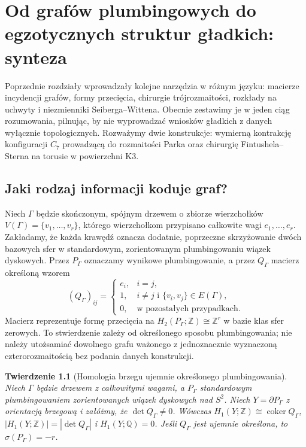\documentclass[11pt,a4paper]{report}
\numberwithin{equation}{section}
\theoremstyle{plain}
\newtheorem{twierdzenie}{Twierdzenie}[section]
\theoremstyle{definition}
\theoremstyle{remark}
\begin{document}
\chapter{Od grafów plumbingowych do egzotycznych struktur gładkich: synteza}
\label{ch:tg-synteza16}

Poprzednie rozdziały wprowadzały kolejne narzędzia w różnym języku:
macierze incydencji grafów, formy przecięcia, chirurgie trójrozmaitości,
rozkłady na uchwyty i niezmienniki Seiberga--Wittena. Obecnie zestawimy
je w jeden ciąg rozumowania, pilnując, by nie wyprowadzać wniosków
gładkich z danych wyłącznie topologicznych. Rozważymy dwie konstrukcje:
wymierną kontrakcję konfiguracji $C_7$ prowadzącą do rozmaitości Parka
oraz chirurgię Fintushela--Sterna na torusie w powierzchni K3.

\section{Jaki rodzaj informacji koduje graf?}
\label{sec:tg-syn-graph}

Niech $\Gamma$ będzie skończonym, spójnym drzewem o zbiorze
wierzchołków $V(\Gamma)=\{v_1,\ldots,v_r\}$, którego wierzchołkom
przypisano całkowite wagi $e_1,\ldots,e_r$. Zakładamy, że każda
krawędź oznacza dodatnie, poprzeczne skrzyżowanie dwóch bazowych sfer
w standardowym, zorientowanym plumbingowaniu wiązek dyskowych.
Przez $P_\Gamma$ oznaczamy wynikowe plumbingowanie, a przez
$Q_\Gamma$ macierz określoną wzorem
\[
 (Q_\Gamma)_{ij}=\begin{cases}
 e_i,&i=j,\\
 1,&i\ne j\text{ i }\{v_i,v_j\}\in E(\Gamma),\\
 0,&\text{w pozostałych przypadkach}.
 \end{cases}
\]
Macierz reprezentuje formę przecięcia na
$H_2(P_\Gamma;\mathbb Z)\cong\mathbb Z^r$ w bazie klas sfer zerowych.
To stwierdzenie zależy od określonego sposobu plumbingowania;
nie należy utożsamiać dowolnego grafu ważonego z jednoznacznie
wyznaczoną czterorozmaitością bez podania danych konstrukcji.

\begin{twierdzenie}[Homologia brzegu ujemnie określonego plumbingowania]
\label{thm:tg-syn-boundary}
Niech $\Gamma$ będzie drzewem z całkowitymi wagami, a
$P_\Gamma$ standardowym plumbingowaniem zorientowanych wiązek
dyskowych nad $S^2$. Niech $Y=\partial P_\Gamma$ z orientacją
brzegową i załóżmy, że $\det Q_\Gamma\ne0$. Wówczas
$H_1(Y;\mathbb Z)\cong\operatorname{coker}Q_\Gamma$,
$|H_1(Y;\mathbb Z)|=|\det Q_\Gamma|$ i
$H_1(Y;\mathbb Q)=0$. Jeśli $Q_\Gamma$ jest ujemnie określona,
to $\sigma(P_\Gamma)=-r$.
\end{twierdzenie}
\end{document}
